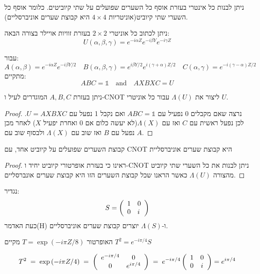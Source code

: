 \documentclass{tstextbook}
\begin{document}
\begin{reminder}
ניתן לבנות כל אינטרי בעזרת אוסף כל השערים שפועלים על שתי קיוביטים. כלומר אוסף כל השערי שתי קיוביט(אוניטריות \(4\times 4\) היא קבוצת שערים אוניברסליים).

\end{reminder}
\begin{reminder}
ניתן לכתוב כל אוניטרי \(2\times 2\) בעזרת זוויות אויילר בצורה הבאה:
$$U\left(\alpha,\beta,\gamma\right)=e^{-i\alpha Z}e^{-i\beta Y}e^{-i\gamma Z}$$

\end{reminder}
\begin{lemma}
עבור:
$$A\left(\alpha,\beta\right)=e^{-i\alpha Z}e^{-i\beta Y/2}\quad B\left(\alpha,\beta,\gamma\right)=e^{i\beta Y/2}e^{i\left(\gamma+\alpha\right)Z/2}\quad C\left(\alpha,\gamma\right)=e^{-i\left(\gamma-\alpha\right)Z/2}$$
מתקיים:
$$A B C=\mathbb{1}\quad{\mathrm{and}}\quad A X B X C=U$$

\end{lemma}
\begin{proposition}
ניתן בעזרת \(A,B,C\) המוגדרים לעיל ו-CNOT ליצור את \(\Lambda(U)\) עבור כל אוניטרי \(U\).

\end{proposition}
\begin{proof}
נרצה שאם מקבלים 0 נפעיל עם \(ABC=\mathbb{1}\) ואם נקבל 1 נפעל עם \(U=AXBXC\). לכן נפעל ראשית עם \(C\) ואז עם \(\Lambda(X)\)(לא יעשה כלום אם 0 ואחרת יפעיל \(X\)) לאחר מכן נפעל עם \(B\) ואז שוב עם \(\Lambda(X)\) ולבסוף שוב עם \(A\).

\end{proof}
\begin{proposition}
קבוצת השערים שפועלים על קיוביט אחד, עם CNOT היא קבוצת שערים אוניברסליית

\end{proposition}
\begin{proof}
ראינו כי בעזרת אופרטורי קיוביט יחיד ו-CNOT ניתן לבנות את כל השערי שתי קיוביט מהצורה \(\Lambda(U)\) כאשר הראנו שכל קבוצת השערים הזו היא קבוצת שערים אונברסליים.

\end{proof}
\begin{proposition}
נגדיר:
$$S=\left(\begin{array}{l l}{{1}}&{{0}}\\ {{0}}&{{i}}\end{array}\right)$$
כעת האדמר(H) ו-\(\Lambda(S)\) יוצרים קבוצת שערים אוניברסליים.

\end{proposition}
\begin{lemma}
האופרטור \(T=\exp\left(-i\pi Z/8\right)\) מקיים \(T^{2}=e^{ -i\pi/4 }S\)

\end{lemma}
$$T^{2}\;=\;\exp\left(-i\pi Z/4\right)\;=\;\left(\begin{array}{c c}{{e^{-i\pi/4}}}&{{0}}\\ {{0}}&{{e^{i\pi/4}}}\end{array}\right)\;=\;e^{-i\pi/4}\left(\begin{array}{c c}{{1}}&{{0}}\\ {{0}}&{{i}}\end{array}\right)=e^{ i\pi/4 }$$
\end{document}
